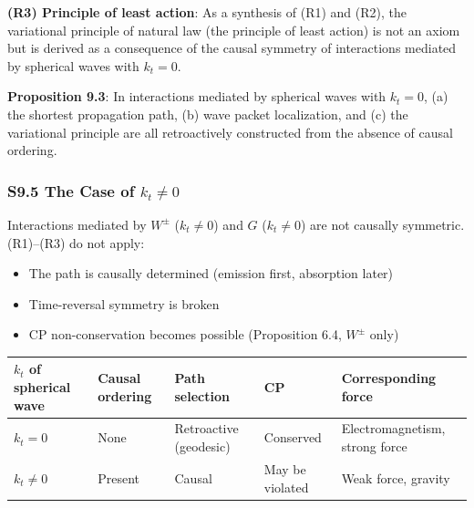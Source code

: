 \documentclass[
  a4paper,11pt]{article}
\newcounter{none}
\providecommand{\tightlist}{%
  \setlength{\itemsep}{0pt}\setlength{\parskip}{0pt}}
\theoremstyle{definition}
\theoremstyle{remark}
\begin{document}
\textbf{(R3) Principle of least action}: As a synthesis of (R1) and
(R2), the variational principle of natural law (the principle of least
action) is not an axiom but is derived as a consequence of the causal
symmetry of interactions mediated by spherical waves with \(k_t = 0\).

\textbf{Proposition 9.3}: In interactions mediated by spherical waves
with \(k_t = 0\), (a) the shortest propagation path, (b) wave packet
localization, and (c) the variational principle are all retroactively
constructed from the absence of causal ordering.

\subsubsection{\texorpdfstring{S9.5 The Case of
\(k_t \neq 0\)}{S9.5 The Case of k\_t \textbackslash neq 0}}\label{s9.5-the-case-of-k_t-neq-0}

Interactions mediated by \(W^{\pm}\) (\(k_t \neq 0\)) and \(G\)
(\(k_t \neq 0\)) are not causally symmetric. (R1)--(R3) do not apply:

\begin{itemize}
\tightlist
\item
  The path is causally determined (emission first, absorption later)
\item
  Time-reversal symmetry is broken
\item
  CP non-conservation becomes possible (Proposition 6.4, \(W^{\pm}\)
  only)
\end{itemize}

{\def\LTcaptype{none} %
\begin{longtable}[]{@{}
  >{\raggedright\arraybackslash}p{}
  >{\raggedright\arraybackslash}p{}
  >{\raggedright\arraybackslash}p{}
  >{\raggedright\arraybackslash}p{}
  >{\raggedright\arraybackslash}p{}@{}}
\toprule\noalign{}
\begin{minipage}[b]{\linewidth}\raggedright
\(k_t\) of spherical wave
\end{minipage} & \begin{minipage}[b]{\linewidth}\raggedright
Causal ordering
\end{minipage} & \begin{minipage}[b]{\linewidth}\raggedright
Path selection
\end{minipage} & \begin{minipage}[b]{\linewidth}\raggedright
CP
\end{minipage} & \begin{minipage}[b]{\linewidth}\raggedright
Corresponding force
\end{minipage} \\
\midrule\noalign{}
\endhead
\bottomrule\noalign{}
\endlastfoot
\(k_t = 0\) & None & Retroactive (geodesic) & Conserved &
Electromagnetism, strong force \\
\(k_t \neq 0\) & Present & Causal & May be violated & Weak force,
gravity \\
\end{longtable}
}
\end{document}
